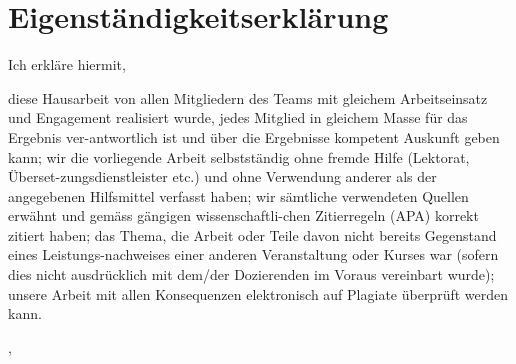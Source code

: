 \section*{Eigenständigkeitserklärung}
Ich erkl\"are hiermit,
\begin{itemize}
\dass diese Hausarbeit von allen Mitgliedern des Teams mit gleichem Arbeitseinsatz und Engagement realisiert wurde, jedes Mitglied in gleichem Masse für das Ergebnis ver-antwortlich ist und über die Ergebnisse kompetent Auskunft geben kann;
\dass wir die vorliegende Arbeit selbstständig ohne fremde Hilfe (Lektorat, Überset-zungsdienstleister etc.) und ohne Verwendung anderer als der angegebenen Hilfsmittel verfasst haben;
\dass wir sämtliche verwendeten Quellen erwähnt und gemäss gängigen wissenschaftli-chen Zitierregeln (APA) korrekt zitiert haben;
\dass das Thema, die Arbeit oder Teile davon nicht bereits Gegenstand eines Leistungs-nachweises einer anderen Veranstaltung oder Kurses war (sofern dies nicht ausdrücklich mit dem/der Dozierenden im Voraus vereinbart wurde);
\dass unsere Arbeit mit allen Konsequenzen elektronisch auf Plagiate überprüft werden kann.
\end{itemize}
\vspace{1cm}
\hfill \theCity, \theDate
\\
\vspace{1.5cm}


\hfill \theAuthor
\thispagestyle{empty}

